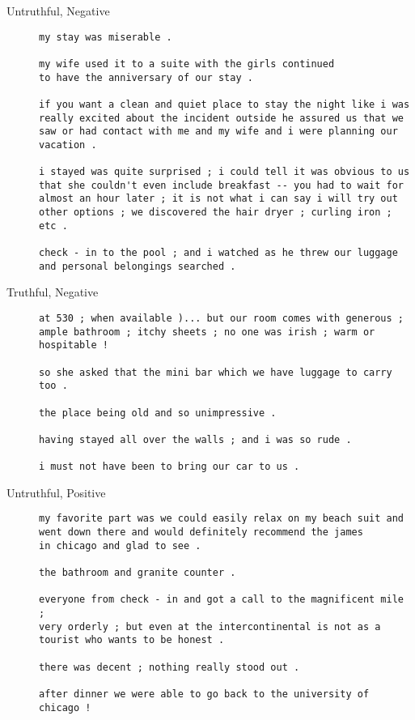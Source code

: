 \documentclass[12pt]{article}
\begin{document}
\begin{description}
\item[Untruthful, Negative] \hfill
\begin{verbatim}
my stay was miserable .

my wife used it to a suite with the girls continued 
to have the anniversary of our stay .

if you want a clean and quiet place to stay the night like i was 
really excited about the incident outside he assured us that we 
saw or had contact with me and my wife and i were planning our vacation .

i stayed was quite surprised ; i could tell it was obvious to us 
that she couldn't even include breakfast -- you had to wait for 
almost an hour later ; it is not what i can say i will try out 
other options ; we discovered the hair dryer ; curling iron ; etc .

check - in to the pool ; and i watched as he threw our luggage 
and personal belongings searched .
\end{verbatim}

\item[Truthful, Negative]\hfill
\begin{verbatim}
at 530 ; when available )... but our room comes with generous ; 
ample bathroom ; itchy sheets ; no one was irish ; warm or hospitable !

so she asked that the mini bar which we have luggage to carry too .

the place being old and so unimpressive .

having stayed all over the walls ; and i was so rude .

i must not have been to bring our car to us .
\end{verbatim}

\item[Untruthful, Positive]\hfill
\begin{verbatim}
my favorite part was we could easily relax on my beach suit and 
went down there and would definitely recommend the james 
in chicago and glad to see .

the bathroom and granite counter .

everyone from check - in and got a call to the magnificent mile ;
very orderly ; but even at the intercontinental is not as a 
tourist who wants to be honest .
 
there was decent ; nothing really stood out .

after dinner we were able to go back to the university of chicago !
\end{verbatim}


\end{description}
\end{document}
